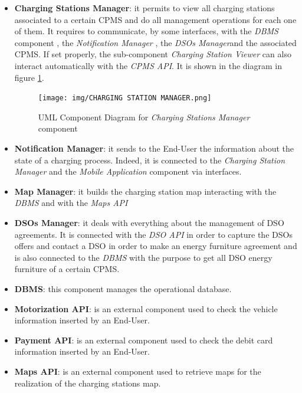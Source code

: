 \documentclass[a4paper]{report}
\begin{document}
\begin{itemize}
\item \textbf{Charging Stations Manager}: it permits to view all charging stations associated to a certain CPMS and do all management operations for each one of them. It requires to communicate, by some interfaces, with the \textit{DBMS} component , the \textit{Notification Manager} , the \textit{DSOs Manager}and the associated CPMS. If set properly, the sub-component \textit{Charging Station Viewer} can also interact automatically with the \textit{CPMS API}. It is shown in the diagram in figure \ref{fig:chargingstationsmgr-component}.


\begin{figure}[htp]
\centering
\texttt{[image: img/CHARGING STATION MANAGER.png]}
\caption{UML Component Diagram for \textit{Charging Stations Manager} component}
\label{fig:chargingstationsmgr-component}
\end{figure}

\item \textbf{Notification Manager}: it sends to the End-User the information about the state of a charging process. Indeed, it is connected to the \textit{Charging Station Manager} and the \textit{Mobile Application} component via interfaces.

\item \textbf{Map Manager}: it builds the charging station map interacting with the \textit{DBMS} and with the \textit{Maps API}

\item \textbf{DSOs Manager}: it deals with everything about the management of DSO agreements. It is connected with the \textit{DSO API} in order to capture the DSOs offers and contact a DSO in order to make an energy furniture agreement and is also connected to the \textit{DBMS} with the purpose to get all DSO energy furniture of a certain CPMS.

\item \textbf{DBMS}: this component manages the operational database.

\item \textbf{Motorization API}: is an external component used to check the vehicle information inserted by an End-User.

\item \textbf{Payment API}: is an external component used to check the debit card information inserted by an End-User.

\item \textbf{Maps API}: is an external component used to retrieve maps for the realization of the charging stations map.


\end{itemize}
\end{document}
